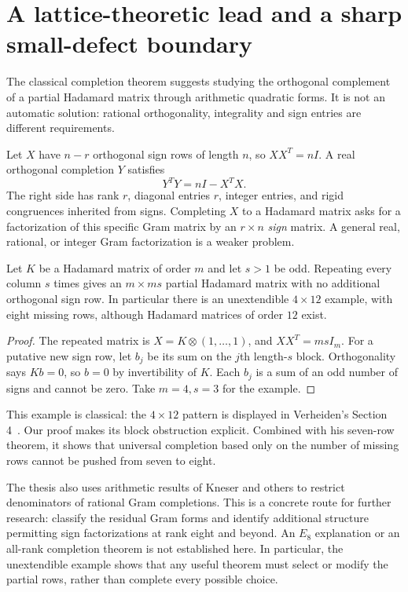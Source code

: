 \section{A lattice-theoretic lead and a sharp small-defect boundary}
\label{sec:completion-lead}
The classical completion theorem suggests studying the orthogonal
complement of a partial Hadamard matrix through arithmetic quadratic
forms. It is not an automatic solution: rational orthogonality,
integrality and sign entries are different requirements.

Let $X$ have $n-r$ orthogonal sign rows of length $n$, so
$XX^T=nI$. A real orthogonal completion $Y$ satisfies
\[
 Y^TY=nI-X^TX.
\]
The right side has rank $r$, diagonal entries $r$, integer entries,
and rigid congruences inherited from signs. Completing $X$ to a
Hadamard matrix asks for a factorization of this specific Gram matrix
by an $r\times n$ \emph{sign} matrix. A general real, rational, or
integer Gram factorization is a weaker problem.

\begin{proposition}
\label{prop:eight-defect}
Let $K$ be a Hadamard matrix of order $m$ and let $s>1$ be odd.
Repeating every column $s$ times gives an $m\times ms$ partial
Hadamard matrix with no additional orthogonal sign row.
In particular there is an unextendible $4\times12$ example, with
eight missing rows, although Hadamard matrices of order $12$ exist.
\end{proposition}
\begin{proof}
The repeated matrix is $X=K\otimes(1,\ldots,1)$, and
$XX^T=msI_m$. For a putative new sign row, let $b_j$ be its sum
on the $j$th length-$s$ block. Orthogonality says $Kb=0$, so $b=0$
by invertibility of $K$. Each $b_j$ is a sum of an odd number of
signs and cannot be zero. Take $m=4,s=3$ for the example.
\end{proof}
This example is classical: the $4\times12$ pattern is displayed
in Verheiden's Section 4~\cite{Verheiden}. Our proof makes its block
obstruction explicit. Combined with his seven-row theorem, it shows
that universal completion based only on the number of missing rows
cannot be pushed from seven to eight.

The thesis also uses arithmetic results of Kneser and others to
restrict denominators of rational Gram completions. This is a
concrete route for further research: classify the residual Gram
forms and identify additional structure permitting sign factorizations
at rank eight and beyond. An $E_8$ explanation or an all-rank
completion theorem is not established here. In particular, the
unextendible example shows that any useful theorem must select or
modify the partial rows, rather than complete every possible choice.
